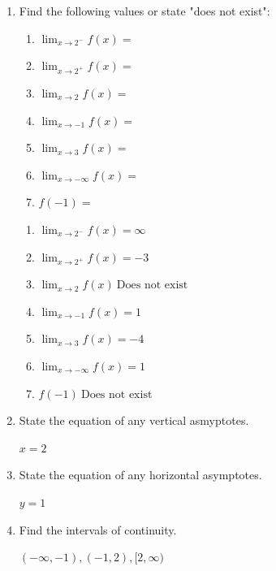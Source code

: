 \documentclass[nooutcomes]{ximera}
\begin{document}
\begin{problem}
\begin{enumerate}
		\item Find the following values or state "does not exist":
			\begin{enumerate}
 			\item $\lim_{x \to 2^-} f(x)=$
			\item $\lim_{x \to 2^+} f(x)=$
			\item $\lim_{x \to 2} f(x)=$
			\item $\lim_{x \to -1} f(x)=$
			\item $\lim_{x \to 3} f(x)=$
			\item $\lim_{x \to -\infty} f(x)=$
			\item $f(-1)=$
			\end{enumerate}
		\begin{freeResponse}
			\begin{enumerate}
 			\item $\lim_{x \to 2^-} f(x)=\infty$
			\item $\lim_{x \to 2^+} f(x)=-3$
			\item $\lim_{x \to 2} f(x)\ \text{Does not exist}$
			\item $\lim_{x \to -1} f(x)=1$
			\item $\lim_{x \to 3} f(x)=-4$
			\item $\lim_{x \to -\infty} f(x)=1$
			\item $f(-1)\  \text{Does not exist}$
			\end{enumerate}
		\end{freeResponse}


		\item State the equation of any vertical asmyptotes.
			\begin{freeResponse}
			$x=2$
			\end{freeResponse}


		\item State the equation of any horizontal asymptotes.
			\begin{freeResponse}
			$y=1$
			\end{freeResponse}
	
		\item Find the intervals of continuity.
			\begin{freeResponse}
			$(-\infty,-1),(-1,2),[2,\infty)$
			\end{freeResponse}
	
	\end{enumerate}
\end{problem}
\end{document}
